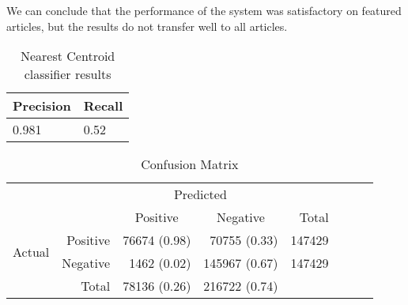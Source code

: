 
We can conclude that the performance of the system was satisfactory on featured articles, but the results do not transfer well to all articles. 


\begin{table}[htbp]
\centering
\begin{tabular}{@{}ll@{}}
\toprule
Precision     & Recall       \\ \midrule
\num{0.981} & \num{0.52} \\
\bottomrule
\end{tabular}
\caption[Nearest Centroid classifier results]{Nearest Centroid classifier results}\label{eval-results}
\end{table}

\begin{table}[htbp]
    \centering
     \begin{tabular}{rrrrrrrr}
      \toprule
      \multicolumn{2}{c}{} & \multicolumn{2}{c}{Predicted} & \\
      \cmidrule{3-4}
      \multicolumn{2}{c}{} & \multicolumn{1}{c}{Positive} & \multicolumn{1}{c}{Negative} & Total \\
      \midrule
      \multirow{2}{*}{Actual} & Positive & \num{76674} (0.98) & \num{70755} (0.33)  & \num{147429} \\
                              & Negative & \num{1462} (0.02)  & \num{145967} (0.67) & \num{147429} \\
                              \cmidrule{1-2}
                              & Total    & \num{78136} (0.26) & \num{216722} (0.74) \\
      \bottomrule
    \end{tabular}
    \caption[Confusion Matrix]{Confusion Matrix}%
    \label{tab:confusionmatrix}
\end{table}

